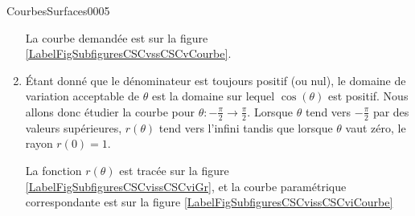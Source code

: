 \begin{corrige}{CourbesSurfaces0005}
\begin{enumerate}
			La courbe demandée est sur la figure \ref{LabelFigSubfiguresCSCvssCSCvCourbe}.

		\item

			\newcommand{\CaptionFigSubfiguresCSCvi}{La courbe de l'exercice \ref{exoCourbesSurfaces0005}.\ref{CSCv}.}
			

			Étant donné que le dénominateur est toujours positif (ou nul), le domaine de variation acceptable de $\theta$ est la domaine sur lequel $\cos(\theta)$ est positif. Nous allons donc étudier la courbe pour $\theta\colon -\frac{ \pi }{2}\to \frac{ \pi }{2}$. Lorsque $\theta$ tend vers $-\frac{ \pi }{2}$ par des valeurs supérieures, $r(\theta)$ tend vers l'infini tandis que lorsque $\theta$ vaut zéro, le rayon $r(0)=1$.

		La fonction $r(\theta)$ est tracée sur la figure \ref{LabelFigSubfiguresCSCvissCSCviGr}, et la courbe paramétrique correspondante est sur la figure \ref{LabelFigSubfiguresCSCvissCSCviCourbe}

	\end{enumerate}
	
\end{corrige}

\clearpage
